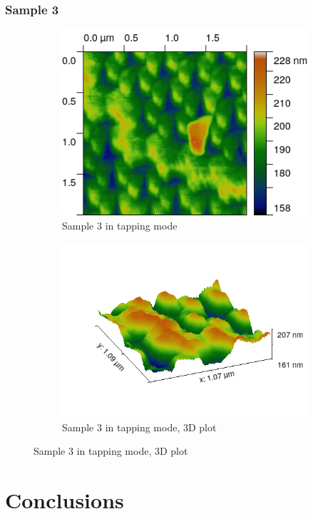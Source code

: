 \documentclass[11pt,a4paper]{article}
\begin{document}
\subsubsection{Sample 3}

\begin{figure}[H]
\centering
\begin{subfigure}[b]{0.45\textwidth}
\includegraphics[width=\textwidth]{tm_sample3}
\caption{Sample 3 in tapping mode}
\label{fig:}
\end{subfigure}
\begin{subfigure}[b]{0.45\textwidth}
\includegraphics[width=\textwidth]{tm_sample3_3D}
\caption{Sample 3 in tapping mode, 3D plot}
\label{fig:}
\end{subfigure}
\end{figure}

\section{Conclusions}


\nocite{*}
\newpage


\end{document}
